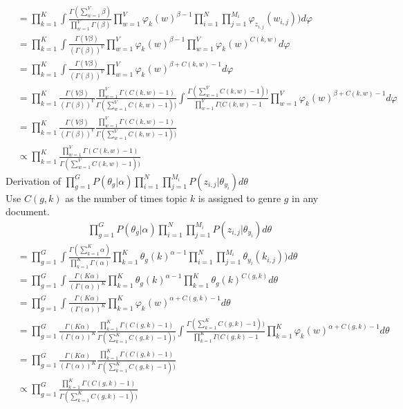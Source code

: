 \begin{align}
&= \prod\limits_{k=1}^K \int\frac{\Gamma (\sum\limits_{w=1}^V \beta)}{\prod\limits_{w=1}^V \Gamma(\beta)} \prod\limits_{w=1}^V  \varphi_{k}(w)^{\beta-1}  \prod^N_{i=1}\prod^{M_i}_{j=1} \varphi_{z_{i,j}}(w_{i,j})) d\varphi\\
&= \prod\limits_{k=1}^K \int \frac{\Gamma (V \beta)}{(\Gamma(\beta))^V} \prod\limits_{w=1}^V  \varphi_{k}(w)^{\beta-1}  \prod\limits_{w=1}^V \varphi_{k}(w)^{C(k,w)} d\varphi\\
&= \prod\limits_{k=1}^K \int \frac{\Gamma (V \beta)}{(\Gamma(\beta))^V}  \prod\limits_{w=1}^V \varphi_{k}(w)^{\beta + C(k,w) -1} d\varphi\\
&= \prod\limits_{k=1}^K \frac{\Gamma (V \beta)}{(\Gamma(\beta))^V}  \frac{\prod\limits_{w=1}^V \Gamma(C(k,w)-1)}{\Gamma(\sum\limits_{w=1}^V C(k,w)-1))} \int \frac{\Gamma(\sum\limits_{w=1}^V C(k,w)-1))}{\prod\limits_{w=1}^V \Gamma(C(k,w)-1}  \prod\limits_{w=1}^V \varphi_{k}(w)^{\beta + C(k,w) -1} d\varphi\\
&=  \prod\limits_{k=1}^K \frac{\Gamma (V \beta)}{(\Gamma(\beta))^V}  \frac{\prod\limits_{w=1}^V \Gamma(C(k,w)-1)}{\Gamma(\sum\limits_{w=1}^V C(k,w)-1))}\\
&\propto \prod\limits_{k=1}^K \frac{\prod\limits_{w=1}^V \Gamma(C(k,w)-1)}{\Gamma(\sum\limits_{w=1}^V C(k,w)-1))}
\end{align}
Derivation of $\prod\limits_{g=1}^G P(\theta_g|\alpha) \prod^N_{i=1}\prod^{M_i}_{j=1} P(z_{i,j}|\theta_{y_i}) d\theta$
~\\Use $C(g,k)$ as the number of times topic $k$ is assigned to genre $g$ in any document.
\begin{align}
\prod\limits_{g=1}^G P(\theta_g|\alpha) \prod^N_{i=1}\prod^{M_i}_{j=1} P(z_{i,j}|\theta_{y_i}) d\theta
\end{align}
\begin{align}
&= \prod\limits_{g=1}^G \int\frac{\Gamma (\sum\limits_{k=1}^K \alpha)}{\prod\limits_{k=1}^K \Gamma(\alpha)} \prod\limits_{k=1}^K  \theta_{g}(k)^{\alpha-1}  \prod^N_{i=1}\prod^{M_i}_{j=1} \theta_{y_{i}}(k_{i,j})) d\theta\\
&= \prod\limits_{g=1}^G \int \frac{\Gamma (K \alpha)}{(\Gamma(\alpha))^K} \prod\limits_{k=1}^K  \theta_{g}(k)^{\alpha-1}  \prod\limits_{k=1}^K \theta_g(k)^{C(g,k)} d\theta\\
&= \prod\limits_{g=1}^G \int \frac{\Gamma (K \alpha)}{(\Gamma(\alpha))^K}  \prod\limits_{k=1}^K \varphi_{k}(w)^{\alpha + C(g,k) -1} d\theta\\
&= \prod\limits_{g=1}^G  \frac{\Gamma (K \alpha)}{(\Gamma(\alpha))^K}  \frac{\prod\limits_{k=1}^K \Gamma(C(g,k)-1)}{\Gamma(\sum\limits_{k=1}^K C(g,k)-1))} \int \frac{\Gamma(\sum\limits_{k=1}^K C(g,k)-1))}{\prod\limits_{k=1}^K \Gamma(C(g,k)-1}  \prod\limits_{k=1}^K \varphi_{k}(w)^{\alpha + C(g,k) -1} d\theta\\
&=  \prod\limits_{g=1}^G  \frac{\Gamma (K \alpha)}{(\Gamma(\alpha))^K}  \frac{\prod\limits_{k=1}^K \Gamma(C(g,k)-1)}{\Gamma(\sum\limits_{k=1}^K C(g,k)-1))} \\
&\propto  \prod\limits_{g=1}^G   \frac{\prod\limits_{k=1}^K \Gamma(C(g,k)-1)}{\Gamma(\sum\limits_{k=1}^K C(g,k)-1))} 
\end{align}
